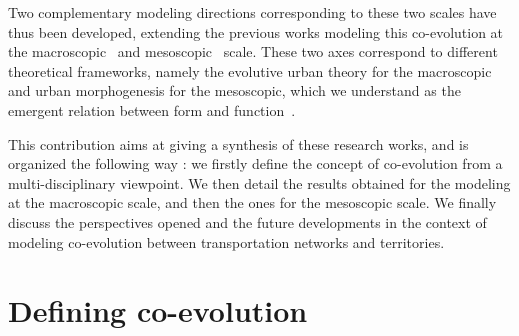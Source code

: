 \documentclass[11pt]{article}
\begin{document}
Two complementary modeling directions corresponding to these two scales have thus been developed, extending the previous works modeling this co-evolution at the macroscopic~\citep{baptistemodeling,schmitt2014modelisation} and mesoscopic~\citep{raimbault2014hybrid} scale. These two axes correspond to different theoretical frameworks, namely the evolutive urban theory for the macroscopic \citep{pumain2018evolutionary} and urban morphogenesis for the mesoscopic, which we understand as the emergent relation between form and function~\citep{doursat2012morphogenetic}.


This contribution aims at giving a synthesis of these research works, and is organized the following way : we firstly define the concept of co-evolution from a multi-disciplinary viewpoint. We then detail the results obtained for the modeling at the macroscopic scale, and then the ones for the mesoscopic scale. We finally discuss the perspectives opened and the future developments in the context of modeling co-evolution between transportation networks and territories.


\section{Defining co-evolution}
\end{document}
